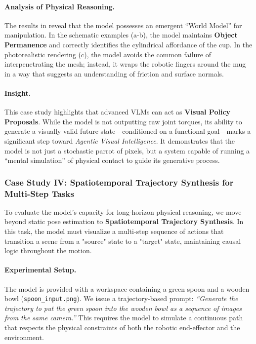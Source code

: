 \documentclass{llmxive}
\begin{document}
\paragraph{Analysis of Physical Reasoning.}
The results in  reveal that the model possesses an emergent ``World Model'' for manipulation. In the schematic examples (a-b), the model maintains \textbf{Object Permanence} and correctly identifies the cylindrical affordance of the cup. In the photorealistic rendering (c), the model avoids the common failure of interpenetrating the mesh; instead, it wraps the robotic fingers around the mug in a way that suggests an understanding of friction and surface normals.

\paragraph{Insight.}
This case study highlights that advanced VLMs can act as \textbf{Visual Policy Proposals}. While the model is not outputting raw joint torques, its ability to generate a visually valid future state—conditioned on a functional goal—marks a significant step toward \textit{Agentic Visual Intelligence}. It demonstrates that the model is not just a stochastic parrot of pixels, but a system capable of running a ``mental simulation'' of physical contact to guide its generative process.

\subsubsection{Case Study IV: Spatiotemporal Trajectory Synthesis for Multi-Step Tasks}
\label{subsubsec:trajectory_synthesis}

To evaluate the model's capacity for long-horizon physical reasoning, we move beyond static pose estimation to \textbf{Spatiotemporal Trajectory Synthesis}. In this task, the model must visualize a multi-step sequence of actions that transition a scene from a "source" state to a "target" state, maintaining causal logic throughout the motion.

\paragraph{Experimental Setup.}
The model is provided with a workspace containing a green spoon and a wooden bowl (\texttt{spoon\_input.png}). We issue a trajectory-based prompt: \textit{``Generate the trajectory to put the green spoon into the wooden bowl as a sequence of images from the same camera.''} This requires the model to simulate a continuous path that respects the physical constraints of both the robotic end-effector and the environment.
\end{document}
